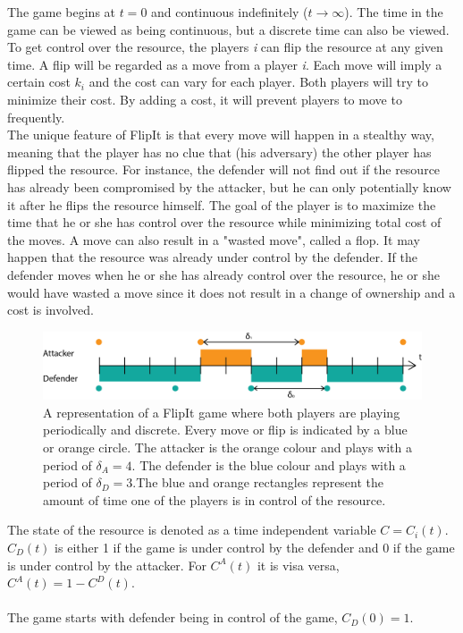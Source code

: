 \documentclass[journal,a4paper]{IEEEtran}
\begin{document}
The game begins at $t=0$ and continuous indefinitely ($t \rightarrow \infty $). The time in the game can be viewed as being continuous, but a discrete time can also be viewed. To get control over the resource, the players \textit{i} can flip the resource at any given time. A flip will be regarded as a move from a player \textit{i}. Each move will imply a certain cost $k_{i}$ and the cost can vary for each player. Both players will try to minimize their cost. By adding a cost, it will prevent players to move to frequently. \\

The unique feature of FlipIt is that every move will happen in a stealthy way, meaning that the player has no clue that (his adversary) the other player has flipped the resource. For instance, the defender will not find out if the resource has already been compromised by the attacker, but he can only potentially know it after he flips the resource himself. The goal of the player is to maximize the time that he or she has control over the resource while minimizing total cost of the moves. A move can also result in a "wasted move", called a flop. It may happen that the resource was already under control by the defender. If the defender moves when he or she has already control over the resource, he or she would have wasted a move since it does not result in a change of ownership and a cost is involved. \\


\begin{figure}[hbtp]
\centering
\includegraphics[scale=0.5]{../../doc/template/Images/DefFlipit}
\caption{A representation of a FlipIt game where both players are playing periodically and discrete. Every move or flip is indicated by a blue or orange circle. The attacker is the orange colour and plays with a period of $\delta_{A}=4$. The defender is the blue colour and plays with a period of $\delta_{D}=3$.The blue and orange rectangles represent the amount of time one of the players is in control of the resource.}
\label{fig:FLipItDefault}
\end{figure}



The state of the resource is denoted as a time independent variable $C=C_{i}(t)$. 
$C_{D}(t)$ is either 1 if the game is under control by the defender and 0 if the game is under control by the attacker. For $C^{A}(t)$ it is visa versa, $C^{A}(t)= 1 - C^{D}(t)$.\\ \\
The game starts with defender being in control of the game, $C_{D}(0)= 1$. 
\end{document}
